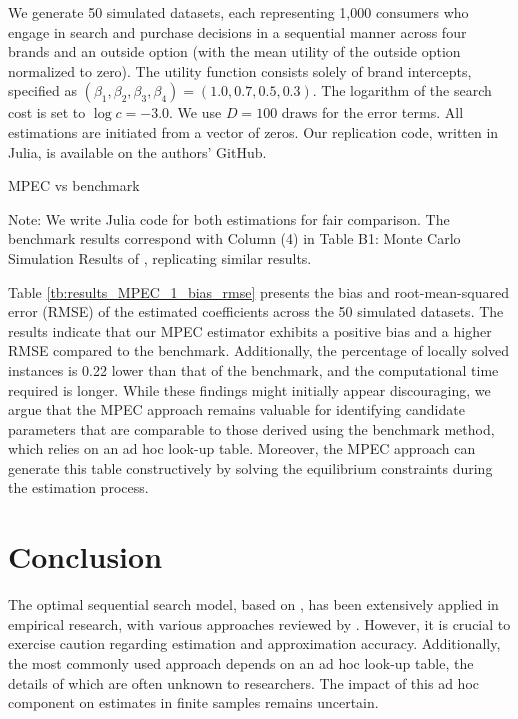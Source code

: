 \documentclass[12pt]{article}
\begin{document}
We generate 50 simulated datasets, each representing 1,000 consumers who engage in search and purchase decisions in a sequential manner across four brands and an outside option (with the mean utility of the outside option normalized to zero). The utility function consists solely of brand intercepts, specified as \((\beta_1,\beta_2,\beta_3,\beta_4) = (1.0, 0.7, 0.5, 0.3)\). The logarithm of the search cost is set to \(\log c = -3.0\). We use \(D = 100\) draws for the error terms. All estimations are initiated from a vector of zeros. Our replication code, written in Julia, is available on the authors' GitHub.


\begin{table}[!htbp]
  \begin{center}
      \caption{MPEC vs benchmark}
      \label{tb:results_MPEC_1_bias_rmse} 
      
  \end{center}
  \footnotesize
  Note: We write Julia code for both estimations for fair comparison. The benchmark results correspond with Column (4) in Table B1: Monte Carlo Simulation Results of \cite{ursu2023sequential}, replicating similar results.
\end{table} 

Table \ref{tb:results_MPEC_1_bias_rmse} presents the bias and root-mean-squared error (RMSE) of the estimated coefficients across the 50 simulated datasets. The results indicate that our MPEC estimator exhibits a positive bias and a higher RMSE compared to the benchmark. Additionally, the percentage of locally solved instances is 0.22 lower than that of the benchmark, and the computational time required is longer. While these findings might initially appear discouraging, we argue that the MPEC approach remains valuable for identifying candidate parameters that are comparable to those derived using the benchmark method, which relies on an ad hoc look-up table. Moreover, the MPEC approach can generate this table constructively by solving the equilibrium constraints during the estimation process.

\section{Conclusion}

The optimal sequential search model, based on \cite{weitzman1979optimal}, has been extensively applied in empirical research, with various approaches reviewed by \cite{ursu2023sequential}. However, it is crucial to exercise caution regarding estimation and approximation accuracy. Additionally, the most commonly used approach depends on an ad hoc look-up table, the details of which are often unknown to researchers. The impact of this ad hoc component on estimates in finite samples remains uncertain.
\end{document}
